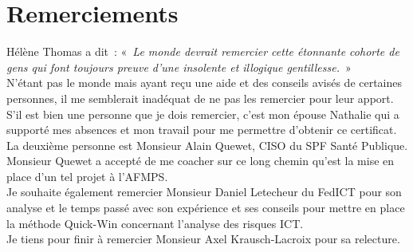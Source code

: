 \documentclass[12pt]{book}
\begin{document}
\renewcommand{\headrulewidth}{0.5pt}
\addtolength{\headheight}{0.5pt}
\renewcommand{\footrulewidth}{0pt}
\fancypagestyle{plain}{ \fancyhead{}
\renewcommand{\headrulewidth}{0pt}}

\thispagestyle{empty}
\setcounter{page}{0}
\null

\pagestyle{plain}
 
 \newpage

\thispagestyle{empty}
\setcounter{page}{0}
\null
\thispagestyle{empty}
\chapter*{Remerciements} 
\thispagestyle{empty}
 \setcounter{page}{1} 

Hélène Thomas a dit~: «~\textit{Le monde devrait remercier cette étonnante cohorte de gens qui font toujours preuve d'une insolente et illogique gentillesse.}~» \\

N'étant pas le monde mais ayant reçu une aide et des conseils avisés de certaines personnes, il me semblerait inadéquat de ne pas les remercier pour leur apport.\\

S'il est bien une personne que je dois remercier, c'est mon épouse Nathalie qui a supporté mes absences et mon travail pour me permettre d’obtenir ce certificat. \\

La deuxième personne est Monsieur Alain Quewet, CISO du SPF Santé Publique. Monsieur Quewet a accepté de me coacher sur ce long chemin qu'est la mise en place d'un tel projet à l'AFMPS.\\ 

Je souhaite également remercier Monsieur Daniel Letecheur du FedICT pour son analyse et le temps passé avec son expérience et ses conseils pour mettre en place la méthode Quick-Win concernant l'analyse des risques ICT.\\

Je tiens pour finir à remercier Monsieur Axel Krausch-Lacroix pour sa relecture.

\thispagestyle{empty}
 \newpage

\thispagestyle{empty}
\setcounter{page}{0}
\null
 \newpage

\thispagestyle{empty}
\setcounter{page}{0}
\null
 \newpage
 
\thispagestyle{empty}
\setcounter{page}{0}
\null

\end{document}
